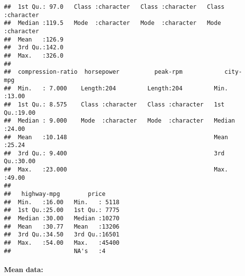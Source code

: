 \documentclass[
]{article}
\newenvironment{Shaded}{\begin{snugshade}}{\end{snugshade}}
\newcommand{\AttributeTok}[1]{\textcolor[rgb]{0.77,0.63,0.00}{#1}}
\newcommand{\ConstantTok}[1]{\textcolor[rgb]{0.00,0.00,0.00}{#1}}
\newcommand{\FunctionTok}[1]{\textcolor[rgb]{0.00,0.00,0.00}{#1}}
\newcommand{\NormalTok}[1]{#1}
\newcommand{\OtherTok}[1]{\textcolor[rgb]{0.56,0.35,0.01}{#1}}
\newcommand{\SpecialCharTok}[1]{\textcolor[rgb]{0.00,0.00,0.00}{#1}}
\newcommand{\StringTok}[1]{\textcolor[rgb]{0.31,0.60,0.02}{#1}}
\begin{document}
\begin{verbatim}
##  1st Qu.: 97.0   Class :character   Class :character   Class :character  
##  Median :119.5   Mode  :character   Mode  :character   Mode  :character  
##  Mean   :126.9                                                           
##  3rd Qu.:142.0                                                           
##  Max.   :326.0                                                           
##                                                                          
##  compression-ratio  horsepower          peak-rpm            city-mpg    
##  Min.   : 7.000    Length:204         Length:204         Min.   :13.00  
##  1st Qu.: 8.575    Class :character   Class :character   1st Qu.:19.00  
##  Median : 9.000    Mode  :character   Mode  :character   Median :24.00  
##  Mean   :10.148                                          Mean   :25.24  
##  3rd Qu.: 9.400                                          3rd Qu.:30.00  
##  Max.   :23.000                                          Max.   :49.00  
##                                                                         
##   highway-mpg        price      
##  Min.   :16.00   Min.   : 5118  
##  1st Qu.:25.00   1st Qu.: 7775  
##  Median :30.00   Median :10270  
##  Mean   :30.77   Mean   :13206  
##  3rd Qu.:34.50   3rd Qu.:16501  
##  Max.   :54.00   Max.   :45400  
##                  NA's   :4
\end{verbatim}

\hypertarget{mean-data}{%
\paragraph{Mean data:}\label{mean-data}}

\begin{Shaded}
\end{Shaded}
\end{document}
